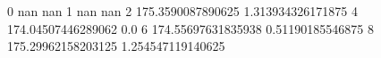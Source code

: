 0 nan nan
1 nan nan
2 175.3590087890625 1.313934326171875
4 174.04507446289062 0.0
6 174.55697631835938 0.51190185546875
8 175.29962158203125 1.254547119140625
